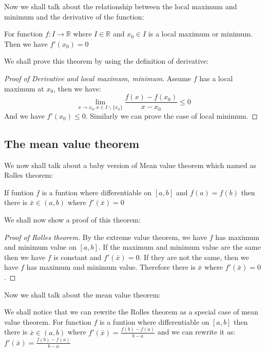 \documentclass{article}
\newcommand{\R}{\mathbb{R}}
\begin{document}
Now we shall talk about the relationship between the local maximum and minimum and the derivative of the function:
\begin{theorem}
  For function $f:I\to \R$ where $I\in \R$ and $x_0\in I$ is a local maximum or minimum. Then we have $f'(x_0)=0$
\end{theorem}
We shall prove this theorem by using the definition of derivative:
\begin{proof}[Proof of Derivative and local maximum, minimum]
  Assume $f$ has a local maximum at $x_0$, then we have:
  \begin{equation*}
    \lim_{x\to x_0,x\in I\backslash \{x_0\}} \frac{f(x)-f(x_0)}{x-x_0}\leq 0
  \end{equation*}
  And we have $f'(x_0)\leq 0$. Similarly we can prove the case of local minimum.
\end{proof}



\subsection{The mean value theorem}
We now shall talk about a baby version of Mean value theorem which named as Rolles theorem:
\begin{theorem}
   If funtion $f$ is a funtion where differentiable on $[a,b]$ and $f(a)=f(b)$ then there is $\bar{x}\in (a,b)$ where $f'(\bar{x})=0$
\end{theorem}
We shall now show a proof of this theorem:
\begin{proof}[Proof of Rolles theorem]
  By the extreme value theorem, we have $f$ has maximum and minimum value on $[a,b]$. If the maximum and minimum value are the same then we have $f$ is constant and $f'(\bar{x})=0$. If they are not the same,
  then we have $f$ has maximum and minimum value. Therefore there is $\bar{x}$ where $f'(\bar{x})=0$.
\end{proof}
Now we shall talk about the mean value theorem:
  \begin{theorem}
We shall notice that we can rewrite the Rolles theorem as a special case of mean value theorem.
For function $f$ is a funtion where differentiable on $[a,b]$ then there is $\bar{x}\in (a,b)$
where $f'(\bar{x})=\frac{f(b)-f(a)}{b-a}$ and we can rewrite it as: $f'(\bar{x})=\frac{f(b)-f(a)}{b-a}$
\end{theorem}
\end{document}
